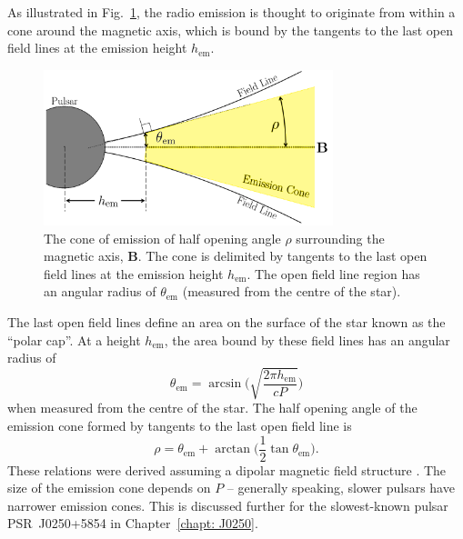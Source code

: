 As illustrated in Fig.~\ref{fig: intro - emission cone}, the radio emission is thought to originate from within a cone around the magnetic axis, which is bound by the tangents to the last open field lines at the emission height $h_\mathrm{em}$.  
\begin{figure}
    \begin{center}
        \includegraphics[width=0.75\textwidth]{Figures/Introduction/cone}
        \caption[The geometry of the emission cone]{The cone of emission of half opening angle $\rho$ surrounding the magnetic axis, $\mathbf{B}$. The cone is delimited by tangents to the last open field lines at the emission height $h_\mathrm{em}$. The open field line region has an angular radius of $\theta_\mathrm{em}$ (measured from the centre of the star).}
        \label{fig: intro - emission cone}
    \end{center}
\end{figure}
The last open field lines define an area on the surface of the star known as the ``polar cap''. At a height $h_\mathrm{em}$, the area bound by these field lines has an angular radius of 
\begin{equation}
    \label{eq: intro - polar cap radius}
	\theta_\mathrm{em} = \arcsin\bigg(\sqrt{\frac{2\pi h_\mathrm{em}}{cP}}\bigg)
\end{equation} 
when measured from the centre of the star. The half opening angle of the emission cone formed by tangents to the last open field line is
\begin{equation}
    \label{eq: intro - cone half opening angle}
	\rho = \theta_\mathrm{em} + \arctan\bigg(\frac{1}{2}\tan\theta_\mathrm{em}\bigg).
\end{equation} 
These relations were derived assuming a dipolar magnetic field structure \citep[see][]{PulsarAstronomy}. The size of the emission cone depends on $P$ -- generally speaking, slower pulsars have narrower emission cones. This is discussed further for the slowest-known pulsar PSR~J0250+5854 in Chapter~\ref{chapt: J0250}.








